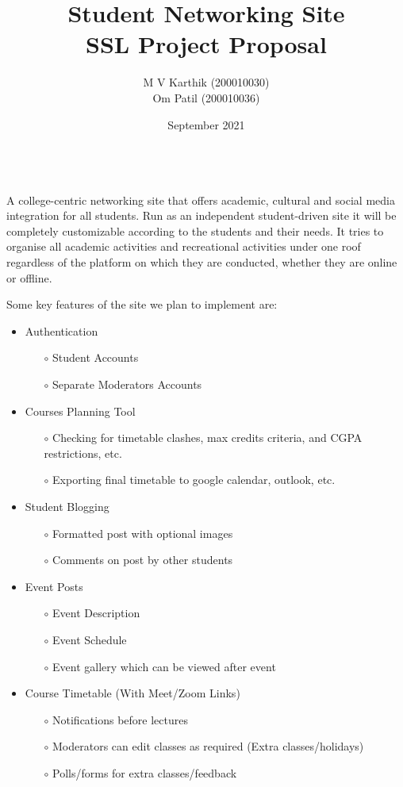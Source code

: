 \documentclass{report}
\title{
  Student Networking Site \\
  \large SSL Project Proposal
  }
\author{M V Karthik (200010030)\\Om Patil (200010036)}
\date{September 2021}
\begin{document}
\maketitle

\newpage

\\

\noindent A college-centric networking site that offers academic, cultural and social media integration for all students. Run as an independent student-driven site it will be completely customizable according to the students and their needs. It tries to organise all academic activities and recreational activities under one roof regardless of the platform on which they are conducted, whether they are online or offline.\vspace{1em}

\noindent Some key features of the site we plan to implement are:
\begin{itemize}
    \item Authentication
    \begin{itemize}
        \item[$\circ$] Student Accounts
        \item[$\circ$] Separate Moderators Accounts
    \end{itemize}
    \item Courses Planning Tool
        \begin{itemize}
            \item[$\circ$] Checking for timetable clashes, max credits criteria, and CGPA restrictions, etc.
            \item[$\circ$] Exporting final timetable to google calendar, outlook, etc.
        \end{itemize}
    \item Student Blogging
    \begin{itemize}
        \item[$\circ$] Formatted post with optional images
        \item[$\circ$] Comments on post by other students
    \end{itemize}
    \item Event Posts
        \begin{itemize}
            \item [$\circ$] Event Description
            \item [$\circ$] Event Schedule
            \item [$\circ$] Event gallery which can be viewed after event
        \end{itemize}
    \item Course Timetable (With Meet/Zoom Links)
    \begin{itemize}
        \item[$\circ$] Notifications before lectures
        \item[$\circ$] Moderators can edit classes as required (Extra classes/holidays)
        \item[$\circ$] Polls/forms for extra classes/feedback
    \end{itemize}
\end{itemize}
\end{document}
